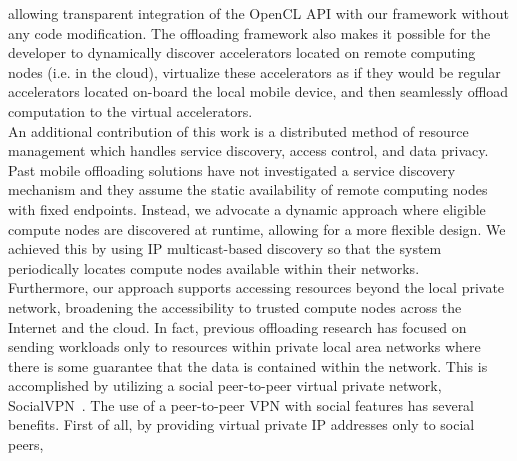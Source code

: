 \documentclass[10pt, conference, compsocconf]{IEEEtran}
\begin{document}
allowing transparent integration of the OpenCL API with our framework 
without any code modification.
%
The offloading framework also makes it possible for the developer to 
dynamically discover accelerators located on remote computing nodes 
(i.e. in the cloud), virtualize these accelerators as if they would be
regular accelerators located on-board the local mobile device, and then
seamlessly offload computation to the virtual accelerators.\\
%
%
%
%
\indent An additional contribution of this work is a distributed method of resource management 
which handles service discovery, access control, and data privacy.
%
Past mobile offloading solutions have not investigated a service discovery 
mechanism and they assume the static availability of remote computing nodes 
with fixed endpoints.
%
Instead, we advocate a dynamic approach where eligible compute nodes are 
discovered at runtime, allowing for a more flexible design. 
%
We achieved this by using IP multicast-based discovery so that the
system periodically locates compute nodes available within their
networks.\\
%
\indent Furthermore, our approach supports accessing resources beyond the local
private network, broadening the accessibility to trusted compute nodes
across the Internet and the cloud.
%
In fact, previous offloading research has focused on sending workloads only to 
resources within private local area networks where there is some guarantee 
that the data is contained within the network.
%
%
This is accomplished by utilizing a social peer-to-peer virtual 
private network, SocialVPN~\cite{socialvpn}.
%
The use of a peer-to-peer VPN with social features has several benefits.
%
First of all, by providing virtual private IP addresses only to social peers, 
\end{document}
